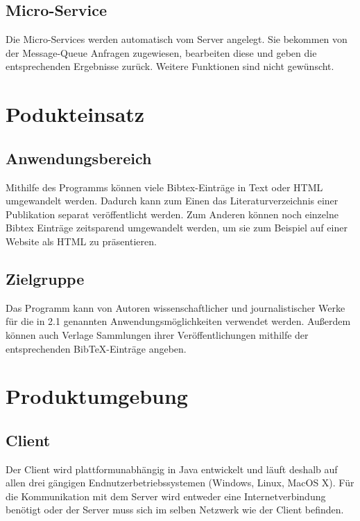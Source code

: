 \documentclass[11pt]{article} %
\begin{document}
\subsection{Micro-Service}

Die Micro-Services werden automatisch vom Server angelegt. Sie bekommen von der Message-Queue Anfragen zugewiesen, bearbeiten diese und geben die entsprechenden Ergebnisse zurück. Weitere Funktionen sind nicht gewünscht.

\clearpage

\section{Podukteinsatz}

\subsection{Anwendungsbereich}

Mithilfe des Programms können viele Bibtex-Einträge in  Text oder HTML umgewandelt werden. Dadurch kann zum Einen das Literaturverzeichnis einer Publikation separat veröffentlicht werden. Zum Anderen können noch einzelne Bibtex Einträge zeitsparend umgewandelt werden, um sie zum Beispiel auf einer Website als HTML zu präsentieren.

\subsection{Zielgruppe}

Das Programm kann von Autoren wissenschaftlicher und journalistischer Werke für die in 2.1 genannten Anwendungsmöglichkeiten verwendet werden. Außerdem können auch Verlage Sammlungen ihrer Veröffentlichungen mithilfe der entsprechenden BibTeX-Einträge angeben.


\clearpage

\section{Produktumgebung}

\subsection{Client}

Der Client wird plattformunabhängig in Java entwickelt und läuft deshalb auf allen drei gängigen Endnutzerbetriebssystemen (Windows, Linux, MacOS X). Für die Kommunikation mit dem Server wird entweder eine Internetverbindung benötigt oder der Server muss sich im selben Netzwerk wie der Client befinden.
\end{document}
